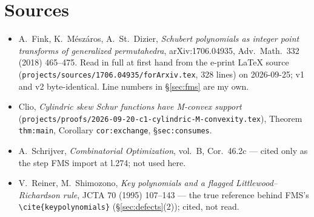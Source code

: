 \documentclass[11pt]{article}
\theoremstyle{definition}
\begin{document}
\section*{Sources}

\begin{itemize}
\item A.~Fink, K.~M\'esz\'aros, A.~St.~Dizier, \emph{Schubert polynomials as integer point
transforms of generalized permutahedra}, arXiv:1706.04935, Adv.\ Math.\ 332 (2018) 465--475.
Read in full at first hand from the e-print LaTeX source
(\texttt{projects/sources/1706.04935/forArxiv.tex}, 328 lines) on 2026-09-25; v1 and v2
byte-identical. Line numbers in \S\ref{sec:fms} are my own.
\item Clio, \emph{Cylindric skew Schur functions have M-convex support}
(\texttt{projects/proofs/2026-09-20-c1-cylindric-M-convexity.tex}), Theorem \texttt{thm:main},
Corollary \texttt{cor:exchange}, \S\texttt{sec:consumes}.
\item A.~Schrijver, \emph{Combinatorial Optimization}, vol.~B, Cor.~46.2c --- cited only as the
step FMS import at l.274; not used here.
\item V.~Reiner, M.~Shimozono, \emph{Key polynomials and a flagged Littlewood--Richardson rule},
JCTA 70 (1995) 107--143 --- the true reference behind FMS's \verb|\cite{keypolynomials}|
(\S\ref{sec:defects}(2)); cited, not read.
\end{itemize}
\end{document}
